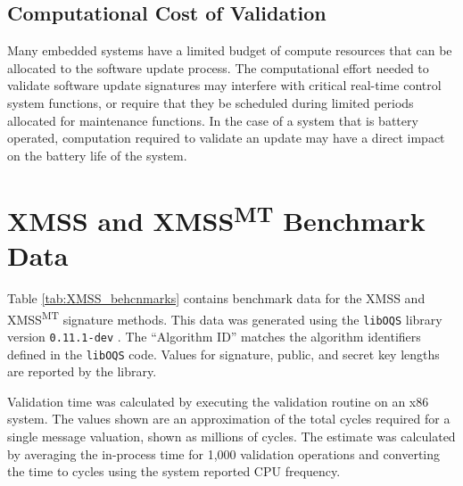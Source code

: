 \documentclass{article}
\begin{document}
\subsection{Computational Cost of Validation}
Many embedded systems have a limited budget of compute resources that can be allocated to the software update process.  The computational effort needed to validate software update signatures may interfere with critical real-time control system functions, or require that they be scheduled during limited periods allocated for maintenance functions.  In the case of a system that is battery operated, computation required to validate an update may have a direct impact on the battery life of the system. 


\section{XMSS and XMSS\textsuperscript{MT} Benchmark Data}
\label{appendix_xmss}
Table \ref{tab:XMSS_behcnmarks} contains benchmark data for the XMSS and XMSS\textsuperscript{MT} signature methods.  This data was generated using the \texttt{libOQS} library version \texttt{0.11.1-dev} \cite{StebilaMosca2017}.  The ``Algorithm ID'' matches the algorithm identifiers defined in the \texttt{libOQS} code.  Values for signature, public, and secret key lengths are reported by the library.

Validation time was calculated by executing the validation routine on an x86 system.  The values shown are an approximation of the total cycles required for a single message valuation, shown as millions of cycles.  The estimate was calculated by averaging the in-process time for 1,000 validation operations and converting the time to cycles using the system reported CPU frequency.  
\end{document}
